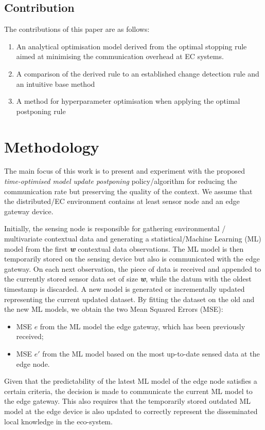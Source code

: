 \documentclass{mpaper}
\begin{document}
\subsection{Contribution}
The contributions of this paper are as follows:
\begin{enumerate}
\item An analytical optimisation model derived from the optimal stopping rule aimed at minimising the communication overhead at EC systems.
\item A comparison of the derived rule to an established change detection rule and an intuitive base method
\item A method for hyperparameter optimisation when applying the optimal postponing rule
\end{enumerate}

\section{Methodology}
The main focus of this work is to present and experiment with the
proposed \textit{time-optimised model update postponing} policy/algorithm for reducing the communication rate but preserving the quality of the context. We assume that the distributed/EC environment contains at least sensor node and an edge gateway device. 

Initially, the sensing node is responsible for gathering environmental / multivariate contextual data and generating a statistical/Machine Learning (ML) model from the first \textbf{\emph{w}} contextual data observations. The ML model is then temporarily stored on the sensing device but also is communicated with the edge gateway. 
On each next observation, the piece of data is received and appended to the currently stored sensor data set of size \textbf{\emph{w}}, while the datum with the oldest timestamp is discarded. 
A new model is generated or incrementally updated representing the current updated dataset. By fitting the dataset on the old and the new ML models, we obtain the two Mean Squared Errors (MSE):
\begin{itemize}
    \item MSE \textbf{$e$} from the ML model the edge gateway, which has been previously received;
\item MSE \textbf{$e'$} from the ML model based on the most up-to-date sensed data at the edge node.
\end{itemize}

Given that the predictability of the latest ML model of the edge node satisfies a certain criteria, the decision is made to communicate the current ML model to the edge gateway. This also requires that the temporarily stored outdated ML model at the edge device is also updated to correctly represent the disseminated local knowledge in the eco-system.
\end{document}

